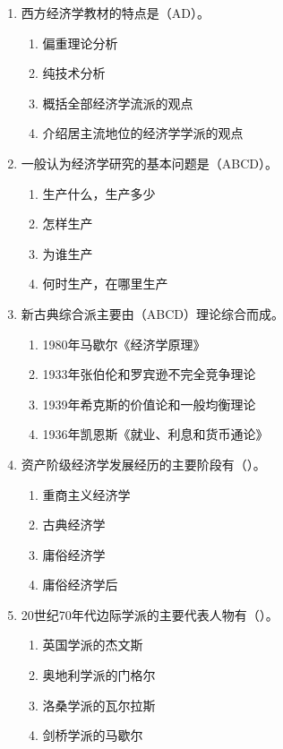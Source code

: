 \documentclass{article}
\begin{document}
\begin{enumerate}[label={\arabic*.}]
    \item 西方经济学教材的特点是（AD）。
    \begin{enumerate}[label={\Alph*.},topsep=0pt,itemsep=0pt]
        \item 偏重理论分析
        \item 纯技术分析
        \item 概括全部经济学流派的观点
        \item 介绍居主流地位的经济学学派的观点
    \end{enumerate}

    \item 一般认为经济学研究的基本问题是（ABCD）。
    \begin{enumerate}[label={\Alph*.},topsep=0pt,itemsep=0pt]
        \item 生产什么，生产多少
        \item 怎样生产
        \item 为谁生产
        \item 何时生产，在哪里生产
    \end{enumerate}

    
    \item 新古典综合派主要由（ABCD）理论综合而成。
    \begin{enumerate}[label={\Alph*.},topsep=0pt,itemsep=0pt]
        \item 1980年马歇尔《经济学原理》
        \item 1933年张伯伦和罗宾逊不完全竞争理论
        \item 1939年希克斯的价值论和一般均衡理论
        \item 1936年凯恩斯《就业、利息和货币通论》
    \end{enumerate}

    \item 资产阶级经济学发展经历的主要阶段有（\quad）。
    \begin{enumerate}[label={\Alph*.},topsep=0pt,itemsep=0pt]
        \item 重商主义经济学
        \item 古典经济学
        \item 庸俗经济学
        \item 庸俗经济学后
    \end{enumerate}

    \item 20世纪70年代边际学派的主要代表人物有（\quad）。
    \begin{enumerate}[label={\Alph*.},topsep=0pt,itemsep=0pt]
        \item 英国学派的杰文斯
        \item 奥地利学派的门格尔
        \item 洛桑学派的瓦尔拉斯
        \item 剑桥学派的马歇尔
    \end{enumerate}


\end{enumerate}
\end{document}
